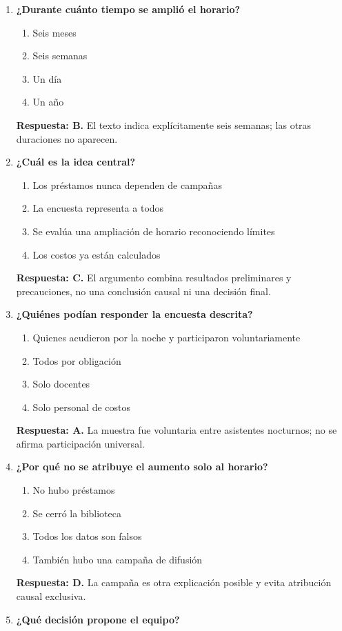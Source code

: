 \begin{enumerate}
\item\textbf{¿Durante cuánto tiempo se amplió el horario?}
\begin{enumerate}[label=\Alph*)]
\item Seis meses
\item Seis semanas
\item Un día
\item Un año
\end{enumerate}
\textbf{Respuesta: B.} El texto indica explícitamente seis semanas; las otras duraciones no aparecen.
\item\textbf{¿Cuál es la idea central?}
\begin{enumerate}[label=\Alph*)]
\item Los préstamos nunca dependen de campañas
\item La encuesta representa a todos
\item Se evalúa una ampliación de horario reconociendo límites
\item Los costos ya están calculados
\end{enumerate}
\textbf{Respuesta: C.} El argumento combina resultados preliminares y precauciones, no una conclusión causal ni una decisión final.
\item\textbf{¿Quiénes podían responder la encuesta descrita?}
\begin{enumerate}[label=\Alph*)]
\item Quienes acudieron por la noche y participaron voluntariamente
\item Todos por obligación
\item Solo docentes
\item Solo personal de costos
\end{enumerate}
\textbf{Respuesta: A.} La muestra fue voluntaria entre asistentes nocturnos; no se afirma participación universal.
\item\textbf{¿Por qué no se atribuye el aumento solo al horario?}
\begin{enumerate}[label=\Alph*)]
\item No hubo préstamos
\item Se cerró la biblioteca
\item Todos los datos son falsos
\item También hubo una campaña de difusión
\end{enumerate}
\textbf{Respuesta: D.} La campaña es otra explicación posible y evita atribución causal exclusiva.
\item\textbf{¿Qué decisión propone el equipo?}

\end{enumerate}
